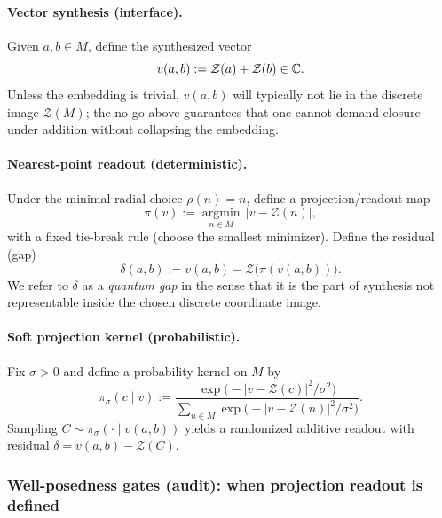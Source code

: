 \paragraph{Vector synthesis (interface).}
\InterfaceTag Given $a,b\in M$, define the synthesized vector
\begin{equation}
\label{eq:v_synthesis}
v(a,b):=\mathcal{Z}(a)+\mathcal{Z}(b)\in\mathbb{C}.
\end{equation}
Unless the embedding is trivial, $v(a,b)$ will typically not lie in the discrete image $\mathcal{Z}(M)$; the no-go above guarantees that one cannot demand closure under addition without collapsing the embedding.

\paragraph{Nearest-point readout (deterministic).}
\InterfaceTag Under the minimal radial choice $\rho(n)=n$, define a projection/readout map
\begin{equation}
\label{eq:nearest_point_projection}
\pi(v):=\operatorname*{argmin}_{n\in M}\,|v-\mathcal{Z}(n)|,
\end{equation}
with a fixed tie-break rule (choose the smallest minimizer).
Define the residual (gap)
\begin{equation}
\label{eq:quantum_gap_delta}
\delta(a,b):=v(a,b)-\mathcal{Z}\big(\pi(v(a,b))\big).
\end{equation}
We refer to $\delta$ as a \emph{quantum gap} in the sense that it is the part of synthesis not representable inside the chosen discrete coordinate image.

\paragraph{Soft projection kernel (probabilistic).}
\InterfaceTag Fix $\sigma>0$ and define a probability kernel on $M$ by
\begin{equation}
\label{eq:projection_kernel_pi_sigma}
\pi_\sigma(c\mid v)
:=
\frac{\exp\!\bigl(-|v-\mathcal{Z}(c)|^2/\sigma^2\bigr)}
{\sum_{n\in M}\exp\!\bigl(-|v-\mathcal{Z}(n)|^2/\sigma^2\bigr)}.
\end{equation}
Sampling $C\sim\pi_\sigma(\cdot\mid v(a,b))$ yields a randomized additive readout with residual $\delta=v(a,b)-\mathcal{Z}(C)$.

\subsubsection{Well-posedness gates (audit): when projection readout is defined}
\label{subsubsec:projection_readout_wellposedness_gates}

